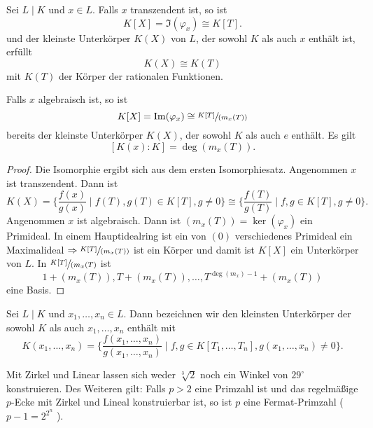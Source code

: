 \begin{proposition}
	Sei $L \mid K$ und $x \in L$. Falls $x$ transzendent ist, so ist 
	\[
		K[X] = \Im(\varphi_{x}) \cong K[T]
	.\] 
	und der kleinste Unterkörper $K(X)$ von $L$, der sowohl $K$ als auch $x$ enthält ist, erfüllt
	\[
		K(X) \cong K(T)
	\] 
	mit  $K(T)$ der Körper der rationalen Funktionen.

	Falls $x$ algebraisch ist, so ist
	\[
		K[X] = \Im(\varphi_{x}) \cong \sfrac{K[T]}{(m_{x}(T))}
	\] 
	bereits der kleinste Unterkörper $K(X)$, der sowohl $K$ als auch $e$ enthält.
	Es gilt
	\[
		[K(x):K] = \deg(m_x(T))
	.\] 
\end{proposition}

\begin{proof}
	Die Isomorphie ergibt sich aus dem ersten Isomorphiesatz.
	Angenommen $x$ ist transzendent. Dann ist 
	\[
		K(X) = \{\frac{f(x)}{g(x)} \mid f(T), g(T) \in K[T], g \neq 0\} \cong \{\frac{f(T)}{g(T)} \mid f,g \in K[T], g \neq 0\} 
	.\]
	Angenommen $x$ ist algebraisch. Dann ist $(m_{x}(T)) = \ker(\varphi_{x})$ ein Primideal.
	In einem Hauptidealring ist ein von $(0)$ verschiedenes Primideal ein Maximalideal $\Rightarrow \sfrac{K[T]}{(m_{x}(T))}$ ist ein
	Körper und damit ist $K[X]$ ein Unterkörper von $L$. In $\sfrac{K[T]}{(m_{x}(T)}$ ist
	\[
		1 + (m_{x}(T)), T + (m_{x}(T)),\ldots, T^{\deg(m_{x})-1} + (m_{x}(T))
	\] 
	eine Basis.
\end{proof}

\begin{definition}
	Sei $L \mid K$ und $x_1,\ldots,x_{n} \in L$. Dann bezeichnen wir den kleinsten Unterkörper der sowohl $K$ als auch $x_1,\ldots,x_{n}$ enthält mit
	\[
		K(x_1,\ldots,x_{n}) = \{\frac{f(x_1,\ldots,x_{n})}{g(x_1,\ldots,x_{n})} \mid f,g \in K[T_1,\ldots,T_{n}], g(x_1,\ldots,x_{n}) \neq 0\} 
	.\] 
\end{definition}

\begin{corollary}[Wantzel, 1837]
	Mit Zirkel und Linear lassen sich weder $\sqrt[3]{2}$ noch ein Winkel von $29^{\circ}$ konstruieren.
	Des Weiteren gilt: Falls $p > 2$ eine Primzahl ist und das regelmäßige $p$-Ecke mit
	Zirkel und Lineal konstruierbar ist, so ist $p$ eine Fermat-Primzahl ($p-1 = 2^{2^{n}}$ ).
\end{corollary}

